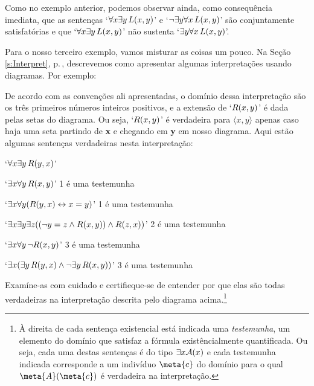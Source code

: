 Como no exemplo anterior, podemos observar ainda, como consequência imediata, que as sentenças `$\forall x \exists y\, \mathord{L}(x,y)$' e `$\neg\exists y \forall x\, \mathord{L}(x,y)$' são conjuntamente satisfatórias e que `$\forall x \exists y\, \mathord{L}(x,y)$' não sustenta `$\exists y \forall x\, \mathord{L}(x,y)$'.

Para o nosso terceiro exemplo, vamos misturar as coisas um pouco.
Na Seção \ref{s:Interpret}, p.\,\pageref{s:Interpret}, descrevemos como apresentar algumas interpretações usando diagramas. Por exemplo:
\begin{center}
\end{center}
De acordo com as convenções ali apresentadas, o domínio dessa interpretação são os três primeiros números inteiros positivos, e a extensão de  `$\mathord{R}(x,y)$' é dada pelas setas do diagrama.
Ou seja, `$\mathord{R}(x,y)$' é verdadeira para $\langle x, y \rangle$ apenas caso haja uma seta partindo  de \textbf{x} e chegando em \textbf{y} em nosso diagrama.
Aqui estão algumas sentenças verdadeiras nesta interpretação:
	\begin{ebullet}
		\item `$\forall x \exists y\, \mathord{R}(y,x)$' 
		\item `$\exists x \forall y\, \mathord{R}(x,y)$' \hfill  {\footnotesize 1 é uma testemunha}
		\item `$\exists x \forall y (\mathord{R}(y,x) \leftrightarrow x = y)$' \hfill {\footnotesize 1 é uma testemunha}
		\item `$\exists x \exists y \exists z ((\neg y = z \wedge \mathord{R}(x,y)) \wedge \mathord{R}(z,x))$' \hfill {\footnotesize 2 é uma testemunha}
		\item `$\exists x \forall y\, \neg \mathord{R}(x,y)$' \hfill {\footnotesize 3 é uma testemunha}
		\item `$\exists x (\exists y\, \mathord{R}(y,x) \wedge \neg \exists y\, \mathord{R}(x,y))$' \hfill {\footnotesize 3 é uma testemunha}
	\end{ebullet}
Examíne-as com cuidado e certifieque-se de entender por que elas são todas verdadeiras na interpretação descrita pelo diagrama acima.\footnote{
	À direita de cada sentença existencial está indicada uma \textit{testemunha}, um elemento do domínio que satisfaz a fórmula existêncialmente quantificada.
	Ou seja, cada uma destas sentenças é do tipo $\exists x \mathord{\mathcal{A}}(x)$ e cada testemunha indicada corresponde a um indivíduo $\meta{c}$ do domínio para o qual $\atom{\meta{A}}{\meta{c}}$ é verdadeira na interpretação.}	
	
